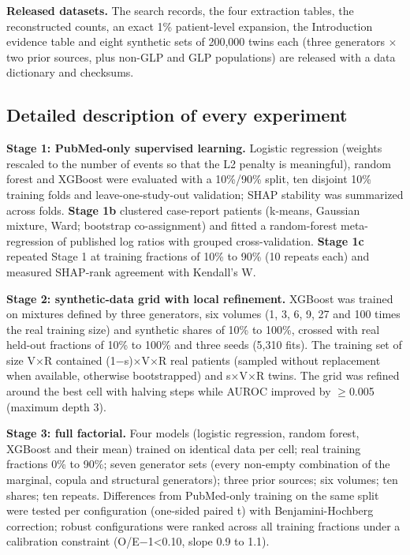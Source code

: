 \documentclass[journal]{IEEEtran}
\begin{document}
\textbf{Released datasets.} The search records, the four extraction
tables, the reconstructed counts, an exact 1\% patient-level expansion,
the Introduction evidence table and eight synthetic sets of 200,000
twins each (three generators \ensuremath{\times} two prior sources, plus non-GLP and GLP
populations) are released with a data dictionary and checksums.

\subsection{Detailed description of every
experiment}\label{detailed-description-of-every-experiment}

\textbf{Stage 1: PubMed-only supervised learning.} Logistic
regression (weights rescaled to the number of events so that the L2
penalty is meaningful), random forest and XGBoost were evaluated with a
10\%/90\% split, ten disjoint 10\% training folds and
leave-one-study-out validation; SHAP stability was summarized across
folds. \textbf{Stage 1b} clustered case-report patients (k-means,
Gaussian mixture, Ward; bootstrap co-assignment) and fitted a
random-forest meta-regression of published log ratios with grouped
cross-validation. \textbf{Stage 1c} repeated Stage 1 at training
fractions of 10\% to 90\% (10 repeats each) and measured SHAP-rank
agreement with Kendall's W.

\textbf{Stage 2: synthetic-data grid with local refinement.} XGBoost
was trained on mixtures defined by three generators, six volumes (1, 3,
6, 9, 27 and 100 times the real training size) and synthetic shares of
10\% to 100\%, crossed with real held-out fractions of 10\% to 100\% and
three seeds (5,310 fits). The training set of size V\ensuremath{\times}R contained
(1\ensuremath{-}s)\ensuremath{\times}V\ensuremath{\times}R real patients (sampled without replacement when available,
otherwise bootstrapped) and s\ensuremath{\times}V\ensuremath{\times}R twins. The grid was refined around the
best cell with halving steps while AUROC improved by \ensuremath{\geq}0.005 (maximum
depth 3).

\textbf{Stage 3: full factorial.} Four models (logistic regression,
random forest, XGBoost and their mean) trained on identical data per
cell; real training fractions 0\% to 90\%; seven generator sets (every
non-empty combination of the marginal, copula and structural
generators); three prior sources; six volumes; ten shares; ten repeats.
Differences from PubMed-only training on the same split were tested per
configuration (one-sided paired t) with Benjamini-Hochberg correction;
robust configurations were ranked across all training fractions under a
calibration constraint (\textbar O/E\ensuremath{-}1\textbar\textless0.10, slope 0.9
to 1.1).
\end{document}
